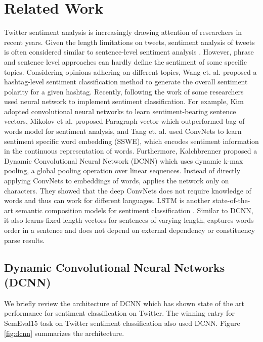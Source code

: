\documentclass{article} %
\begin{document}
\section{Related Work}
Twitter sentiment analysis is increasingly drawing attention of researchers in recent years. 
Given the length limitations on tweets, sentiment analysis of tweets is often considered similar to sentence-level sentiment analysis \cite{kouloumpis2011twitter}.
However, phrase and sentence level approaches can hardly define the sentiment of some specific topics. Considering opinions adhering on different topics, Wang et. al. \cite{wang2011topic} proposed a hashtag-level sentiment classification method  to generate the overall sentiment polarity for a given hashtag.
Recently, following the work of \cite{mikolov2013efficient} some researchers used neural network to implement sentiment classification. 
For example, Kim \cite{kim2014convolutional} adopted convolutional neural networks to learn sentiment-bearing sentence vectors, Mikolov et al. \cite{mikolov2013distributed} proposed Paragraph vector which outperformed bag-of-words model for sentiment analysis, and Tang et. al. \cite{tang2014learning} used ConvNets to learn sentiment specific word embedding (SSWE), which encodes sentiment information in the continuous
representation of words.
Furthermore, Kalchbrenner \cite{kalchbrenner2014convolutional} proposed a Dynamic Convolutional Neural Network (DCNN) which uses dynamic k-max pooling, a global pooling operation over linear sequences.
Instead of directly applying ConvNets to embeddings of words, \cite{zhang2015character} applies the network only on characters. They showed that the deep ConvNets does not require knowledge of words and thus can work for different languages.
LSTM \cite{hochreiter1997long} is another state-of-the-art semantic composition models for sentiment classification \cite{li2015tree}. Similar to DCNN, it also learns fixed-length vectors for sentences of varying length, captures words order in a sentence and does not depend on external dependency or constituency parse results.

\subsection{Dynamic Convolutional Neural Networks (DCNN)}
We briefly review the architecture of DCNN \cite{kalchbrenner2014convolutional} which has shown state of the art performance for sentiment classification on Twitter. The winning entry for SemEval15 \cite{severynunitn} task on Twitter sentiment classification also used DCNN. Figure \ref{fig:dcnn} summarizes the architecture.
\end{document}
